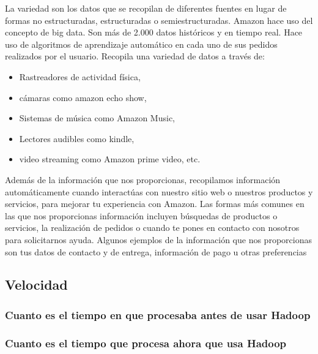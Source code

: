 La variedad son los datos que se recopilan de diferentes fuentes en lugar de formas no estructuradas, estructuradas o semiestructuradas. Amazon hace uso del concepto de big data. Son más de 2.000 datos históricos y en tiempo real. Hace uso de algoritmos de aprendizaje automático en cada uno de sus pedidos realizados por el usuario. Recopila una variedad de datos a través de:

\begin{itemize}
	\item Rastreadores de actividad física,
	\item cámaras como amazon echo show,
	\item Sistemas de música como Amazon Music,
	\item Lectores audibles como kindle,
	\item video streaming como Amazon prime video, etc.
\end{itemize}

Además de la información que nos proporcionas, recopilamos información automáticamente cuando interactúas con nuestro sitio web o nuestros productos y servicios, para mejorar tu experiencia con Amazon.
Las formas más comunes en las que nos proporcionas información incluyen búsquedas de productos o servicios, la realización de pedidos o cuando te pones en contacto con nosotros para solicitarnos ayuda. Algunos ejemplos de la información que nos proporcionas son tus datos de contacto y de entrega, información de pago u otras preferencias 


\clearpage
\subsection{Velocidad}

\subsubsection{Cuanto es el tiempo en que procesaba antes de usar Hadoop}
\lipsum[1] %

\subsubsection{Cuanto es el tiempo que procesa ahora que usa Hadoop}


